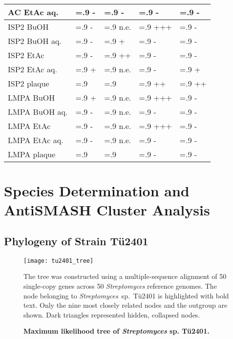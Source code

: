 \begin{table}[htbp]
\begin{tabularx}{\textwidth}{>{\hsize=1.4\hsize}X>{\hsize=.9\hsize}X>{\hsize=.9\hsize}X>{\hsize=.9\hsize}X>{\hsize=.9\hsize}X}
            AC EtAc aq.     & -     & -     & -     & -    \\
            \midrule
            ISP2 BuOH       & -     & n.e.  & +++   & -    \\
            ISP2 BuOH aq.   & -     & +     & -     & -    \\
            ISP2 EtAc       & -     & ++    & -     & -    \\
            ISP2 EtAc aq.   & +     & n.e.  & -     & +    \\
            ISP2 plaque     &       &       & ++    & ++   \\
            \midrule
            LMPA BuOH       & +     & n.e.  & +++   & -    \\
            LMPA BuOH aq.   & -     & n.e.  & -     & -    \\
            LMPA EtAc       & -     & n.e.  & +++   & -    \\
            LMPA EtAc aq.   & -     & n.e.  & -     & -    \\
            LMPA plaque     &       &       & -     & -    \\
            \bottomrule
        \end{tabularx}
    \end{table}


\section{Species Determination and AntiSMASH Cluster Analysis} %
\label{sec:species_antismash}

    \subsection{Phylogeny of Strain Tü2401} %
    \label{sub:phylogeny_of_strain_tue2401}

	\begin{figure}[htbp]
		\texttt{[image: tu2401\_tree]}
		\caption[Maximum likelihood tree of \emph{Streptomyces} sp. Tü2401.]{\textbf{Maximum likelihood tree of \emph{Streptomyces} sp. Tü2401.}} The tree was constructed using a multiple-sequence alignment of 50 single-copy genes across 50 \textit{Streptomyces} reference genomes. The node belonging to \textit{Streptomyces}~sp.~Tü2401 is highlighted with bold text. Only the nine most closely related nodes and the outgroup are shown. Dark triangles represented hidden, collapsed nodes.
		\label{fig:phylo_tree} 
	\end{figure}


